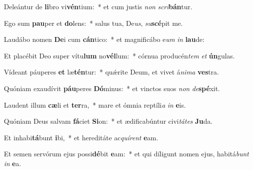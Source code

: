 \item Deleántur de \textbf{li}bro vi\textbf{vén}tium:~* et cum justis \textit{non} \textit{scri}\textbf{bán}tur.
\item Ego sum \textbf{pau}per et \textbf{do}lens:~* salus tua, De\textit{us}, \textit{su}\textbf{scé}pit me.
\item Laudábo nomen \textbf{De}i cum \textbf{cán}tico:~* et magnificábo e\textit{um} \textit{in} \textbf{lau}de:
\item Et placébit Deo super vítu\textbf{lum} no\textbf{vél}lum:~* córnua producén\textit{tem} \textit{et} \textbf{ún}gulas.
\item Vídeant páuperes \textbf{et} læ\textbf{tén}tur:~* quǽrite Deum, et vivet á\textit{ni}\textit{ma} \textbf{ves}tra.
\item Quóniam exaudívit \textbf{páu}peres \textbf{Dó}minus:~* et vinctos suos \textit{non} \textit{de}\textbf{spé}xit.
\item Laudent illum \textbf{cæ}li et \textbf{ter}ra,~* mare et ómnia reptíli\textit{a} \textit{in} \textbf{e}is.
\item Quóniam Deus salvam \textbf{fá}ciet \textbf{Si}on:~* et ædificabúntur civi\textit{tá}\textit{tes} \textbf{Ju}da.
\item Et inhabi\textbf{tá}bunt \textbf{i}bi,~* et hereditáte ac\textit{quí}\textit{rent} \textbf{e}am.
\item Et semen servórum ejus possi\textbf{dé}bit \textbf{e}am:~* et qui díligunt nomen ejus, habitá\textit{bunt} \textit{in} \textbf{e}a.
